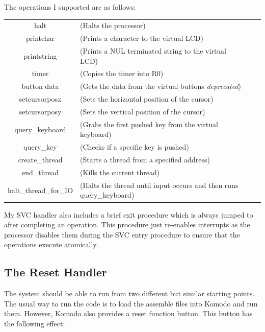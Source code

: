 The operations I supported are as follows:

\begin{tabular}{cl cl}
	halt & (Halts the processor) \\
	printchar & (Prints a character to the virtual LCD) \\
	printstring & (Prints a NUL terminated string to the virtual LCD) \\
	timer & (Copies the timer into R0) \\
	button data  & (Gets the data from the virtual buttons \textit{deprecated}) \\
	setcursorposx & (Sets the horizontal position of the cursor) \\
	setcursorposy & (Sets the vertical position of the cursor) \\
	query\_keyboard & (Grabs the first pushed key from the virtual keyboard) \\
	query\_key & (Checks if a specific key is pushed) \\
	create\_thread & (Starts a thread from a specified address) \\
	end\_thread & (Kills the current thread) \\
	halt\_thread\_for\_IO & (Halts the thread until input occurs and then runs query\_keyboard) \\
\end{tabular} 
\bigskip

My SVC handler also includes a brief exit procedure which is always jumped to after completing an operation. This procedure just re-enables interrupts as the processor disables them during the SVC entry procedure to ensure that the operations execute atomically. 
\subsection{The Reset Handler}
The system should be able to run from two different but similar starting points. The usual way to run the code is to load the assemble files into Komodo and run them. However, Komodo also provides a reset function button. This button has the following effect:

